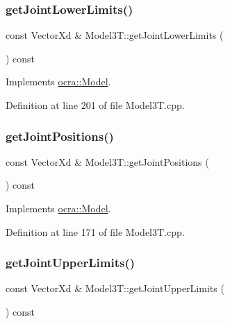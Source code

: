 \hypertarget{classModel3T_aea8da0b07db1efd0a8f578f0afad2372}{}\label{classModel3T_aea8da0b07db1efd0a8f578f0afad2372} 
\subsubsection{\texorpdfstring{get\+Joint\+Lower\+Limits()}{getJointLowerLimits()}}
{\footnotesize\ttfamily const Vector\+Xd \& Model3\+T\+::get\+Joint\+Lower\+Limits (\begin{DoxyParamCaption}{ }\end{DoxyParamCaption}) const\hspace{0.3cm}{\ttfamily [virtual]}}



Implements \hyperlink{classocra_1_1Model_ade47bb5ea3029b3d5652109d1ec6df7f}{ocra\+::\+Model}.



Definition at line 201 of file Model3\+T.\+cpp.

\hypertarget{classModel3T_abcaa7a21ab72837d469e5b13db23f0bc}{}\label{classModel3T_abcaa7a21ab72837d469e5b13db23f0bc} 
\subsubsection{\texorpdfstring{get\+Joint\+Positions()}{getJointPositions()}}
{\footnotesize\ttfamily const Vector\+Xd \& Model3\+T\+::get\+Joint\+Positions (\begin{DoxyParamCaption}{ }\end{DoxyParamCaption}) const\hspace{0.3cm}{\ttfamily [virtual]}}



Implements \hyperlink{classocra_1_1Model_a9af46a69337d88d28232554175723018}{ocra\+::\+Model}.



Definition at line 171 of file Model3\+T.\+cpp.

\hypertarget{classModel3T_a5b2add8312e0251e43cd1027a6a72056}{}\label{classModel3T_a5b2add8312e0251e43cd1027a6a72056} 
\subsubsection{\texorpdfstring{get\+Joint\+Upper\+Limits()}{getJointUpperLimits()}}
{\footnotesize\ttfamily const Vector\+Xd \& Model3\+T\+::get\+Joint\+Upper\+Limits (\begin{DoxyParamCaption}{ }\end{DoxyParamCaption}) const\hspace{0.3cm}{\ttfamily [virtual]}}



